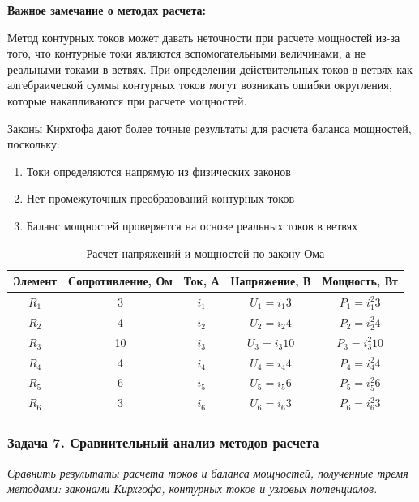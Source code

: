 \textbf{Важное замечание о методах расчета:}
\begin{flushleft}
Метод контурных токов может давать неточности при расчете мощностей из-за того, что контурные токи являются вспомогательными величинами, а не реальными токами в ветвях. При определении действительных токов в ветвях как алгебраической суммы контурных токов могут возникать ошибки округления, которые накапливаются при расчете мощностей.

Законы Кирхгофа дают более точные результаты для расчета баланса мощностей, поскольку:
\begin{enumerate}
    \item Токи определяются напрямую из физических законов
    \item Нет промежуточных преобразований контурных токов
    \item Баланс мощностей проверяется на основе реальных токов в ветвях
\end{enumerate}
\end{flushleft}
\begin{table}[H]
\centering
\begin{tabular}{|c|c|c|c|c|}
\hline
\textbf{Элемент} & \textbf{Сопротивление, Ом} & \textbf{Ток, А} & \textbf{Напряжение, В} & \textbf{Мощность, Вт} \\
\hline
$R_1$ & 3 & $i_1$ & $U_1 = i_1 3$ & $P_1 = i_1^2 3$ \\
\hline
$R_2$ & 4 & $i_2$ & $U_2 = i_2 4$ & $P_2 = i_2^2 4$ \\
\hline
$R_3$ & 10 & $i_3$ & $U_3 = i_3 10$ & $P_3 = i_3^2 10$ \\
\hline
$R_4$ & 4 & $i_4$ & $U_4 = i_4 4$ & $P_4 = i_4^2 4$ \\
\hline
$R_5$ & 6 & $i_5$ & $U_5 = i_5 6$ & $P_5 = i_5^2 6$ \\
\hline
$R_6$ & 3 & $i_6$ & $U_6 = i_6 3$ & $P_6 = i_6^2 3$ \\
\hline
\end{tabular}
\caption{Расчет напряжений и мощностей по закону Ома}
\label{tab:ohm_law_calculations}
\end{table}

\subsubsection{Задача 7. Сравнительный анализ методов расчета}
\textit{Сравнить результаты расчета токов и баланса мощностей, полученные тремя методами: законами Кирхгофа, контурных токов и узловых потенциалов.}

